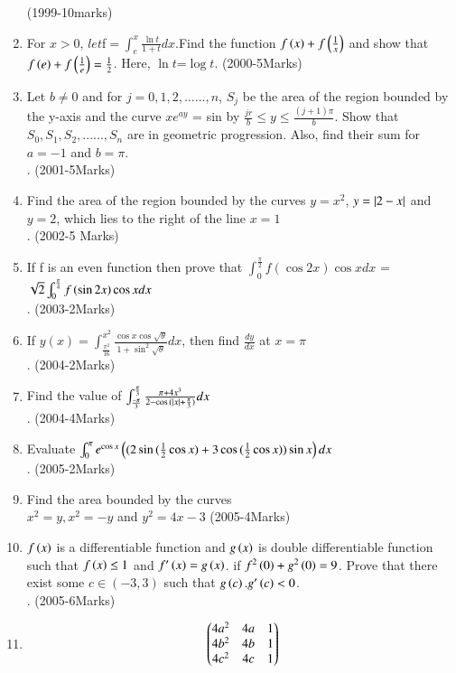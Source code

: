 \documentclass[journal,12pt,onecolumn]{IEEEtran}
\theoremstyle{remark}
\begin{document}
\begin{enumerate}
\hfill{(1999-10marks)}\\
\item For $x > 0 $, $let $f$=\int_{e}^{x}\frac{\ln{t}}{1+t}dx$.Find the function $f\left(x\right) + f\left(\frac{1}{x}\right)$
 and show that $f\left(e\right)+f\left(\frac{1}{e}\right)=
\frac{1}{2}$. Here, $\ln{t}$=$\log{t}$.
\hfill{(2000-5Marks)}
\item Let $b\neq0$ and for $j=0, 1, 2, \dots{...}, n$, $S_j$ be the area of the region bounded by the y-axis and the curve $xe^{ay}$ = sin by $\frac{jr}{b} \le y \le \frac{(j+1)\pi}{b}$. Show that  $S_0,S_1,S_2,......,S_n$ are in geometric progression. Also, find their sum for $a=-1$ and $b= \pi$. \\.
\hfill{(2001-5Marks)}
\item Find the area of the region bounded by the curves $y=x^2$, $y=\left\vert2-x\right\vert$ and $y=2$, which lies to the right of the line $x=1$\\. 
\hfill{(2002-5 Marks)}
\item If f is an even function then prove that 	$\int_{0}^{\frac{\pi}{2}}f(\cos{2x})\cos{x}dx$ =$\sqrt{2}\int_{0}^{\frac{\pi}{4}}f\left(\sin{2x}\right)\cos{x}dx$\\.
\hfill{(2003-2Marks)}
\item If $y(x)=\int_{\frac{\pi^2}{16}}^{x^2}\frac{\cos{x}\cos{\sqrt{\theta}}}{1+\sin^2{\sqrt{\theta}}}dx$, then find $\frac{dy}{dx}$ at $x=\pi$\\.
\hfill{(2004-2Marks)}
\item  Find the value of $\int_{\frac{-\pi}{3}}^{\frac{\pi}{3}}\frac{\pi+4x^3}{2-\cos{(\left\vert x\right\vert+\frac{\pi}{3})}}dx$\\.
\hfill{(2004-4Marks)}
\item Evaluate $\int_{0}^{\pi}e^{\cos{x}}\left((2\sin{(\frac{1}{2}\cos{x}})+3\cos{(\frac{1}{2}\cos{x})})\sin{x}\right)dx$\\.
\hfill{(2005-2Marks)}
\item Find the area bounded by the curves \\  
$x^2=y,x^2=-y$ and $y^2=4x-3$
\hfill{(2005-4Marks)}
\item  $f\left(x\right)$ is a differentiable function and $g\left(x\right)$ is  double differentiable function such that $f\left(x\right)\le1$ and $f^{\prime}\left(x\right)=g\left(x\right)$. if $f^2\left(0\right)+g^2\left(0\right)=9$. Prove that there exist some $c\in(-3,3)$ such that $g\left(c\right).g^{\prime}\left(c\right)<0$.\\.
\hfill{(2005-6Marks)}
\item 
  \[
\begin{pmatrix} 4a^2 & 4a & 1\\4b^2 & 4b & 1\\4c^2 & 4c & 1\end{pmatrix}
\]
\end{enumerate}
\end{document}
